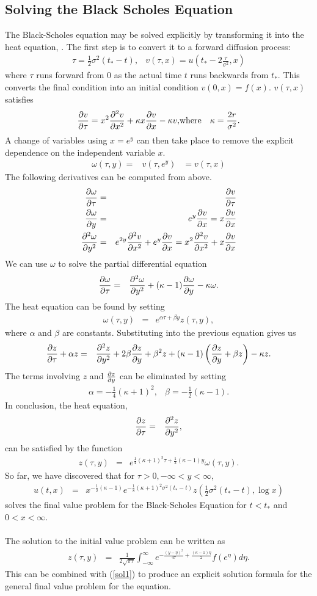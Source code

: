 \documentclass{article}
\newcommand{\bea}{\begin{eqnarray*}}
\newcommand{\eea}{\end{eqnarray*}}
\newcommand{\pp}[2]{{\partial #1 \over \partial #2}}
\newcommand{\ppn}[3]{{\partial^{#1} #2 \over \partial #3^{#1}}}
\begin{document}
\subsection{Solving the Black Scholes Equation}
The Black-Scholes equation may be solved explicitly by transforming it into the heat equation, \cite{textbook}. The first step is to convert it to a forward diffusion process:\\
\bea
\tau = \frac{1}{2} \sigma^2(t_*-t), & v(\tau, x) = u(t_*-2\frac{\tau}{\sigma^2}, x)
\eea
where $\tau$ runs forward from 0 as the actual time $t$ runs backwards from $t_*$. This converts the final condition into an initial condition $v(0,x) = f(x)$. $v(\tau,x)$ satisfies
\bea
\pp{v}{\tau} = x^2 \ppn{2}{v}{x}+\kappa x\pp{v}{x}-\kappa v, & \text{where} & \kappa = \frac{2r}{\sigma^2}.
\eea
A change of variables using $x = e^y$ can then take place to remove the explicit dependence on the independent variable $x$.
\bea
\omega(\tau, y) =& v(\tau, e^y) &= v(\tau, x)
\eea
The following derivatives can be computed from above.
\bea
\pp{\omega}{\tau} &=& \pp{v}{\tau}\\
\pp{\omega}{y} &=& e^y\pp{v}{x} = x\pp{v}{x}\\
\ppn{2}{\omega}{y} &=& e^{2y}\ppn{2}{v}{x} + e^y\pp{v}{x} = x^2\ppn{2}{v}{x} + x\pp{v}{x}
\eea
We can use $\omega$ to solve the partial differential equation
\bea
\pp{\omega}{\tau} &=& \ppn{2}{\omega}{y} + (\kappa-1)\pp{\omega}{y} - \kappa \omega.
\eea
The heat equation can be found by setting
\bea
\omega(\tau, y) &=& e^{\alpha \tau+\beta y}z(\tau, y),
\eea
where $\alpha$ and $\beta$ are constants. Substituting into the previous equation gives us
\bea
\pp{z}{\tau} + \alpha z &=& \ppn{2}{z}{y} +2\beta\pp{z}{y} + \beta^2 z+(\kappa-1)\left(\pp{z}{y}+\beta z\right) - \kappa z.
\eea
The terms involving $z$ and $\pp{z}{y}$ can be eliminated by setting
\bea
\alpha = -\frac{1}{4} (\kappa+1)^2, & \beta = -\frac{1}{2} (\kappa-1).
\eea
In conclusion, the heat equation,
\bea
\pp{z}{\tau} &=& \ppn{2}{z}{y},
\eea
can be satisfied by the function
\bea
z(\tau,y) &=& e^{\frac{1}{4}(\kappa+1)^2\tau+\frac{1}{2}(\kappa-1)y}\omega(\tau, y).
\eea
So far, we have discovered that for $\tau > 0, -\infty < y < \infty$,
\begin{eqnarray}\label{sol1}
u(t,x) &=& x^{-\frac{1}{2}(\kappa-1)}e^{-\frac{1}{8}(\kappa+1)^2\sigma^2(t_*-t)}z\left(\frac{1}{2}\sigma^2(t_*-t), \log x\right)
\end{eqnarray}
solves the final value problem for the Black-Scholes Equation for $t<t_*$ and $0<x<\infty$.\\\\
The solution to the initial value problem can be written as
\bea
z(\tau,y) &=& \frac{1}{2\sqrt{\pi\tau}}\int_{-\infty}^{\infty}{e^{-\frac{(y-\eta)^2}{4\tau}+\frac{(\kappa-1)\eta}{2}}f(e^\eta)d\eta}.
\eea
This can be combined with (\ref{sol1}) to produce an explicit solution formula for the general final value problem for the equation.
\end{document}
